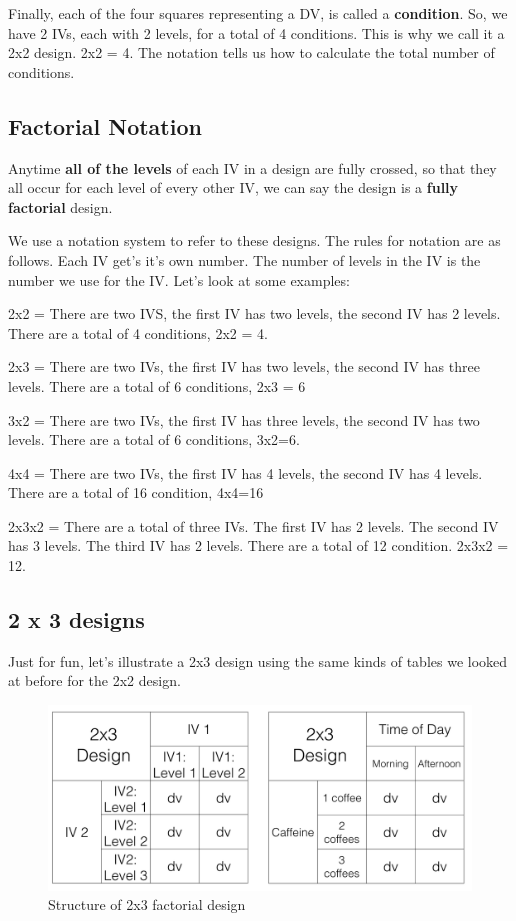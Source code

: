 \documentclass[
]{book}
\begin{document}
Finally, each of the four squares representing a DV, is called a \textbf{condition}. So, we have 2 IVs, each with 2 levels, for a total of 4 conditions. This is why we call it a 2x2 design. 2x2 = 4. The notation tells us how to calculate the total number of conditions.

\hypertarget{factorial-notation}{%
\subsection{Factorial Notation}\label{factorial-notation}}

Anytime \textbf{all of the levels} of each IV in a design are fully crossed, so that they all occur for each level of every other IV, we can say the design is a \textbf{fully factorial} design.

We use a notation system to refer to these designs. The rules for notation are as follows. Each IV get's it's own number. The number of levels in the IV is the number we use for the IV. Let's look at some examples:

2x2 = There are two IVS, the first IV has two levels, the second IV has 2 levels. There are a total of 4 conditions, 2x2 = 4.

2x3 = There are two IVs, the first IV has two levels, the second IV has three levels. There are a total of 6 conditions, 2x3 = 6

3x2 = There are two IVs, the first IV has three levels, the second IV has two levels. There are a total of 6 conditions, 3x2=6.

4x4 = There are two IVs, the first IV has 4 levels, the second IV has 4 levels. There are a total of 16 condition, 4x4=16

2x3x2 = There are a total of three IVs. The first IV has 2 levels. The second IV has 3 levels. The third IV has 2 levels. There are a total of 12 condition. 2x3x2 = 12.

\hypertarget{x-3-designs}{%
\subsection{2 x 3 designs}\label{x-3-designs}}

Just for fun, let's illustrate a 2x3 design using the same kinds of tables we looked at before for the 2x2 design.

\begin{figure}
\centering
\includegraphics{figures/2x3Design.png}
\caption{\label{fig:923design}Structure of 2x3 factorial design}
\end{figure}
\end{document}
